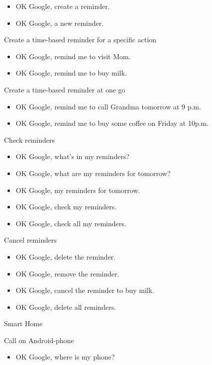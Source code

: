 \documentclass[
  a4paper,
]{article}
\providecommand{\tightlist}{%
  \setlength{\itemsep}{0pt}\setlength{\parskip}{0pt}}\usepackage{longtable,booktabs,array}
\begin{document}
\begin{itemize}
\item
  OK Google, create a reminder.
\item
  OK Google, a new reminder.
\end{itemize}

Create a time-based reminder for a specific action

\begin{itemize}
\item
  OK Google, remind me to visit Mom.
\item
  OK Google, remind me to buy milk.
\end{itemize}

Create a time-based reminder at one go

\begin{itemize}
\item
  OK Google, remind me to call Grandma tomorrow at 9 p.m.
\item
  OK Google, remind me to buy some coffee on Friday at 10p.m.
\end{itemize}

Check reminders

\begin{itemize}
\item
  OK Google, what's in my reminders?
\item
  OK Google, what are my reminders for tomorrow?
\item
  OK Google, my reminders for tomorrow.
\item
  OK Google, check my reminders.
\item
  OK Google, check all my reminders.
\end{itemize}

Cancel reminders

\begin{itemize}
\item
  OK Google, delete the reminder.
\item
  OK Google, remove the reminder.
\item
  OK Google, cancel the reminder to buy milk.
\item
  OK Google, delete all reminders.
\end{itemize}

Smart Home

Call on Android-phone

\begin{itemize}
\tightlist
\item
  OK Google, where is my phone?
\end{itemize}
\end{document}
